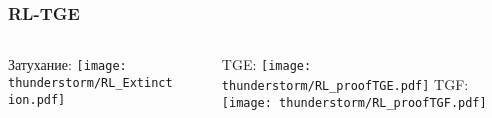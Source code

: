 \begin{frame}
\frametitle{RL-TGE}
\begin{columns}
    \begin{column}{0.5\textwidth}
        Затухание:
        \texttt{[image: thunderstorm/RL\_Extinction.pdf]}
    \end{column}
    \vline~
    \begin{column}{0.5\textwidth} 
        TGE:
        \texttt{[image: thunderstorm/RL\_proofTGE.pdf]}
        TGF:
        \texttt{[image: thunderstorm/RL\_proofTGF.pdf]}
    \end{column}
\end{columns}  
\end{frame}



%
%
%



